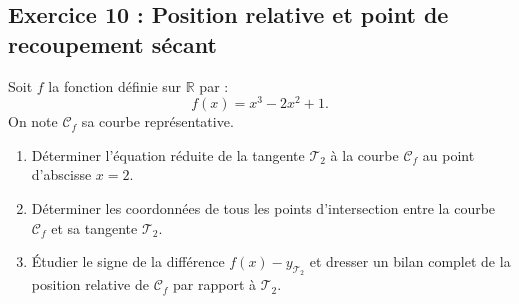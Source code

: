 \documentclass[11pt,a4paper]{article}
\newcommand{\R}{\mathbb{R}}
\begin{document}
\subsection*{Exercice 10 : Position relative et point de recoupement sécant}

Soit $f$ la fonction définie sur $\R$ par :
\[
f(x) = x^3 - 2x^2 + 1.
\]
On note $\mathcal{C}_f$ sa courbe représentative.
\begin{enumerate}[label=\textbf{\arabic*.}]
    \item Déterminer l'équation réduite de la tangente $\mathcal{T}_2$ à la courbe $\mathcal{C}_f$ au point d'abscisse $x = 2$.
    \item Déterminer les coordonnées de tous les points d'intersection entre la courbe $\mathcal{C}_f$ et sa tangente $\mathcal{T}_2$.
    \item Étudier le signe de la différence $f(x) - y_{\mathcal{T}_2}$ et dresser un bilan complet de la position relative de $\mathcal{C}_f$ par rapport à $\mathcal{T}_2$.
\end{enumerate}
\end{document}
